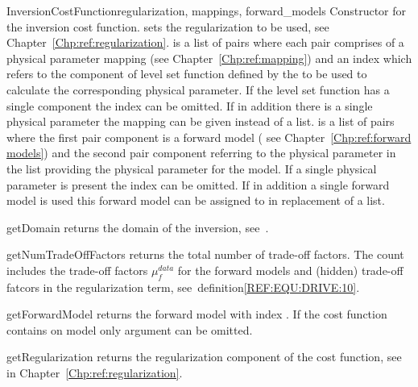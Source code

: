 \begin{classdesc}{InversionCostFunction}{regularization, mappings, forward_models}
Constructor for the inversion cost function.  sets the regularization to be used, see Chapter~\ref{Chp:ref:regularization}.
 is a list of pairs where each pair comprises of a 
physical parameter mapping (see Chapter~\ref{Chp:ref:mapping}) and an index which refers to the component of level set function
defined by the  to be used to calculate the corresponding physical parameter. If 
the level set function has a single component the index can be omitted. If in addition there is a single physical parameter
the mapping can be given instead of a list.  is a list of pairs where the 
first pair component is a forward model ( see Chapter~\ref{Chp:ref:forward models}) and the second 
pair component referring to the physical parameter in the  list providing the  physical parameter for the model.
If a single physical parameter is present the index can be omitted. If in addition a single  forward model is used this
forward model can be assigned to  in replacement of a list.
\end{classdesc}


\begin{methoddesc}[InversionCostFunction]{getDomain}{}
returns the \escript domain of the inversion, see~\cite{ESCRIPT}.
\end{methoddesc}
        
\begin{methoddesc}[InversionCostFunction]{getNumTradeOffFactors}{}
returns the total number of trade-off factors. The count includes the trade-off factors $\mu^{data}_{f}$ for 
the forward models and (hidden) trade-off fatcors in the regularization term, see~definition\ref{REF:EQU:DRIVE:10}.
\end{methoddesc}

\begin{methoddesc}[InversionCostFunction]{getForwardModel}{}
returns the forward model with index . If the cost function contains
on model only argument  can be omitted.  
\end{methoddesc}
        
\begin{methoddesc}[InversionCostFunction]{getRegularization}{}
returns the regularization component of the cost function, see  in Chapter~\ref{Chp:ref:regularization}.
\end{methoddesc}

